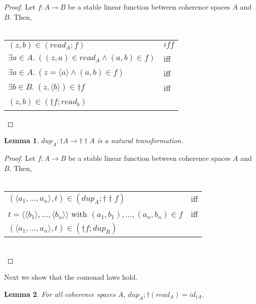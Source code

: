 \documentclass{article}
\newtheorem{lemma}{Lemma}
\begin{document}
\begin{proof}
Let $f : A \multimap B$ be a stable linear function between coherence spaces $A$ and $B$. Then,\\~\\
\begin{tabular}{ll}
$(z,b) \in (\mathit{read}_A;f)$ & $\mathit{iff}$ \\
$\exists a \in A.~((z,a) \in \mathit{read}_A \wedge (a,b) \in f) $ & iff \\
$\exists a \in A.~(z = \langle a \rangle \wedge (a,b) \in f)$ & iff \\

$\exists b \in B.~(z,\langle b \rangle) \in \dagger f$ & iff \\
$(z,b) \in (\dagger f;\mathit{read}_b)$ & ~ 
\end{tabular} 
\end{proof}

\begin{lemma}
$\mathit{dup}_A : \dagger A \to \dagger \dagger A$ is a natural transformation. 
\end{lemma}

\begin{proof}

Let $f : A \to B$ be a stable linear function between coherence spaces $A$ and $B$. Then,\\~\\
\begin{tabular}{ll}
$(\langle a_1,\ldots,a_n \rangle,t) \in (\mathit{dup}_A; \dagger \dagger f)$ & iff \\
$t = \langle \langle b_1 \rangle,\ldots, \langle b_n \rangle \rangle$ with $(a_1,b_1),\ldots,(a_n,b_n) \in f$ & iff \\
$(\langle a_1,\ldots,a_n \rangle,t)  \in (\dagger f; dup_B)$
\end{tabular}~\\

\end{proof}

Next we show that the comonad laws hold.

\begin{lemma}
For all coherence spaces $A$, $\mathit{dup}_A;\dagger(\mathit{read}_A) = \mathit{id}_{\dagger A}$.
\end{lemma}
\end{document}
